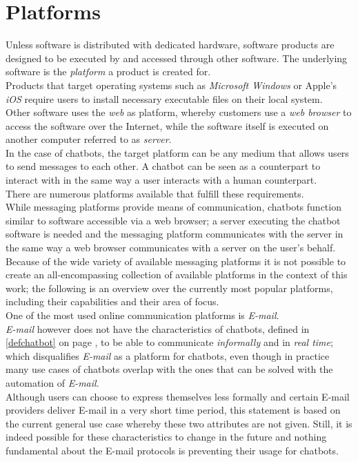 \section{Platforms}
\label{platforms}


Unless software is distributed with dedicated hardware, software products are designed to be executed by and accessed through other software.
The underlying software is the \emph{platform} a product is created for.
\\
Products that target operating systems such as \emph{Microsoft Windows} or Apple's \emph{iOS} require users to install necessary executable files on their local system.
\\
Other software uses the \emph{web} as platform, whereby customers use a \emph{web browser} to access the software over the Internet,
while the software itself is executed on another computer referred to as \emph{server}.
\\

In the case of chatbots, the target platform can be any medium that allows users to send messages to each other.
A chatbot can be seen as a counterpart to interact with in the same way a user interacts with a human counterpart.
\\

There are numerous platforms available that fulfill these requirements.
\\

While messaging platforms provide means of communication, chatbots function similar to software accessible via a web browser;
a server executing the chatbot software is needed and the messaging platform communicates with the server in the same way a web browser communicates with a server on the user's behalf.
\\

Because of the wide variety of available messaging platforms it is not possible to create an all-encompassing collection of available platforms in the context of this work;
the following is an overview over the currently most popular platforms, including their capabilities and their area of focus.
\\

One of the most used online communication platforms is \emph{E-mail}.
\\
\emph{E-mail} however does not have the characteristics of chatbots, defined in \ref{defchatbot} on page \pageref{defchatbot}, to be able to communicate \emph{informally} and in \emph{real time};
which disqualifies \emph{E-mail} as a platform for chatbots, even though in practice many use cases of chatbots overlap with the ones that can be solved with the automation of \emph{E-mail}.
\\
Although users can choose to express themselves less formally and certain E-mail providers deliver E-mail in a very short time period,
this statement is based on the current general use case whereby these two attributes are not given.
Still, it is indeed possible for these characteristics to change in the future
and nothing fundamental about the E-mail protocols is preventing their usage for chatbots.
\\

